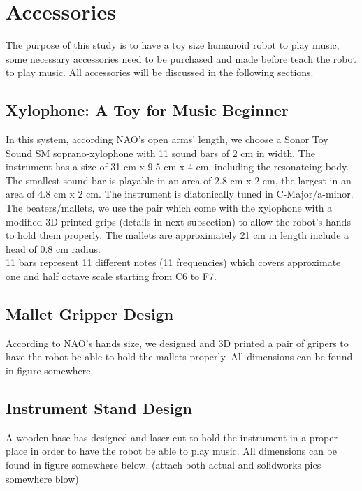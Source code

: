 \section{Accessories}
The purpose of this study is to have a toy size humanoid robot to play music,
some necessary accessories need to be purchased and made before teach the robot
to play music. All accessories will be discussed in the following sections.\\

\subsection{Xylophone: A Toy for Music Beginner}
In this system, according NAO's open arms' length, we choose a Sonor Toy Sound SM soprano-xylophone with 11 sound bars of 2 cm in width. The instrument has a size of 
31 cm x 9.5 cm x 4 cm, including the resonateing body. The smallest sound bar is 
playable in an area of 2.8 cm x 2 cm, the largest in an area of 4.8 cm x 2 cm. The 
instrument is diatonically tuned in C-Major/a-minor. The beaters/mallets, we use 
the pair which come with the xylophone with a modified 3D printed grips (details in next 
subsection) to allow the robot's hands to hold them properly. The mallets 
are approximately 21 cm in length include a head of 0.8 cm radius.\\ 
11 bars represent 11 different notes (11 frequencies) which covers 
approximate one and half octave scale starting from C6 to F7. \\

\subsection{Mallet Gripper Design}
According to NAO's hands size, we designed and 3D printed a pair of gripers to 
have the robot be able to hold the mallets properly. All dimensions can be found 
in figure somewhere.\\

\subsection{Instrument Stand Design}
A wooden base has designed and laser cut to hold the instrument in a proper place 
in order to have the robot be able to play music. All dimensions can be found in 
figure somewhere below. (attach both actual and solidworks pics somewhere blow)\\

